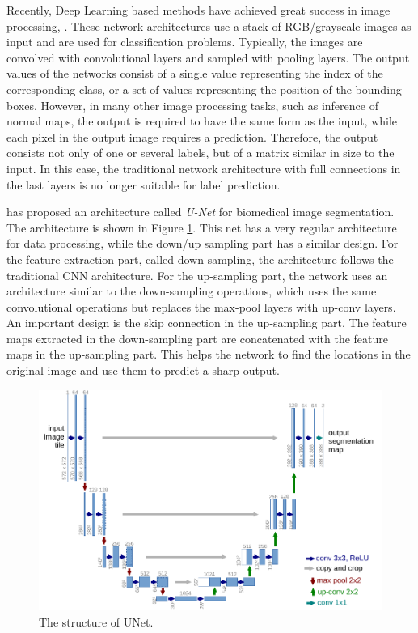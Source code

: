 Recently, Deep Learning based methods have achieved great success in image processing\cite{yolov3}, \cite{efficientDet}. These network architectures use a stack of RGB/grayscale images as input and are used for classification problems. Typically, the images are convolved with convolutional layers and sampled with pooling layers. The output values of the networks consist of a single value representing the index of the corresponding class, or a set of values representing the position of the bounding boxes\cite{yolov3}. However, in many other image processing tasks, such as inference of normal maps, the output is required to have the same form as the input, while each pixel in the output image requires a prediction. Therefore, the output consists not only of one or several labels, but of a matrix similar in size to the input. In this case, the traditional network architecture with full connections in the last layers is no longer suitable for label prediction.

\cite{unet} has proposed an architecture called \textit{U-Net} for biomedical image segmentation. The architecture is shown in Figure \ref{fig:u-net}. This net has a very regular architecture for data processing, while the down/up sampling part has a similar design. For the feature extraction part, called down-sampling, the architecture follows the traditional CNN architecture. For the up-sampling part, the network uses an architecture similar to the down-sampling operations, which uses the same convolutional operations but replaces the max-pool layers with up-conv layers. An important design is the skip connection in the up-sampling part. The feature maps extracted in the down-sampling part are concatenated with the feature maps in the up-sampling part. This helps the network to find the locations in the original image and use them to predict a sharp output.

\begin{figure}[th]
	\centering
	\captionsetup{width=\linewidth}
	\includegraphics[width=\textwidth]{./Figures/u-net-illustration-correct-scale2.pdf}
	\decoRule
	\caption{The structure of UNet. \cite{unet}}
	\label{fig:u-net}
\end{figure}

